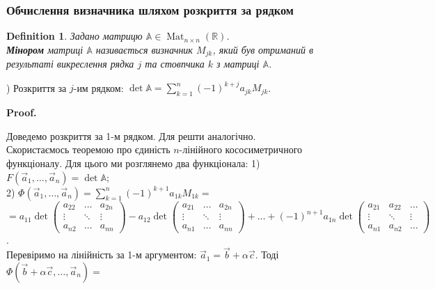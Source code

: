 \documentclass[a4paper, 10pt]{article}
\makeatletter
\theoremstyle{theoremdd}
\newtheorem{definition}[theorem]{Definition}
\DeclareMathOperator{\Mat}{Mat}
\renewenvironment{proof}[1][Proof.\\]{\par
\pushQED{\hfill \qed}%
\normalfont \topsep6\p@\@plus6\p@\relax
\trivlist
\item\relax
{\bfseries
#1\@addpunct{.}}\hspace\labelsep\ignorespaces
}{%
\popQED\endtrivlist\@endpefalse
}
\makeatother
\begin{document}
\subsubsection*{Обчислення визначника шляхом розкриття за рядком}
\begin{definition}
Задано матрицю $\mathbb{A} \in \Mat_{n \times n}(\mathbb{R})$.\\
\textbf{Мінором} матриці $\mathbb{A}$ називається визначник $M_{jk}$, який був отриманий в результаті викреслення рядка $j$ та стовпчика $k$ з матриці $\mathbb{A}$.
\end{definition}

) Розкриття за $j$-им рядком: \qquad $\det \mathbb{A} = \displaystyle \sum_{k=1}^n (-1)^{k+j} a_{jk}M_{jk}$.

\begin{proof}
Доведемо розкриття за 1-м рядком. Для решти аналогічно.\\
Скористаємось теоремою про єдиність $n$-лінійного кососиметричного функціоналу. Для цього ми розглянемо два функціонала:
1) $F(\vec{a}_1,\dots, \vec{a}_n) = \det \mathbb{A}$;\\
2) $\Phi(\vec{a}_1,\dots, \vec{a}_n) = \displaystyle \sum_{k=1}^n (-1)^{k+1} a_{1k}M_{1k} =$\\
$= a_{11} \det \begin{pmatrix} a_{22} & \dots & a_{2n} \\ \vdots & \ddots & \vdots \\ a_{n2} & \dots & a_{nn} \end{pmatrix} - a_{12} \det \begin{pmatrix} a_{21} & \dots & a_{2n} \\ \vdots & \ddots & \vdots \\ a_{n1} & \dots & a_{nn} \end{pmatrix} + \dots + (-1)^{n+1} a_{1n} \det \begin{pmatrix} a_{21} & a_{22} & \dots \\ \vdots & \ddots & \vdots \\ a_{n1} & a_{n2} & \dots \end{pmatrix}$.\\
Перевіримо на лінійність за 1-м аргументом: $\vec{a}_1 = \vec{b} + \alpha \vec{c}$. Тоді\\
$\Phi(\vec{b}+\alpha \vec{c},\dots,\vec{a}_n) =$ \\

\end{proof}
\end{document}
